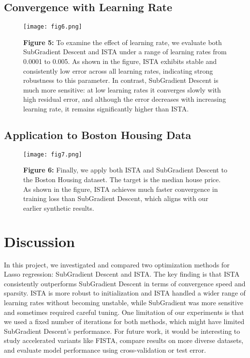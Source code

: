 \documentclass[11pt]{article}
\begin{document}
\subsection{Convergence with Learning Rate}


\begin{figure}[H]
\centering
\begin{minipage}{0.3\textwidth}
    \texttt{[image: fig6.png]}
\end{minipage}
\hfill
\begin{minipage}{0.5\textwidth}
    \small
    \textbf{Figure 5:} 
To examine the effect of learning rate, we evaluate both SubGradient Descent and ISTA under a range of learning rates from 0.0001 to 0.005.
As shown in the figure, ISTA exhibits stable and consistently low error across all learning rates, indicating strong robustness to this parameter. In contrast, SubGradient Descent is much more sensitive: at low learning rates it converges slowly with high residual error, and although the error decreases with increasing learning rate, it remains significantly higher than ISTA. 
\end{minipage}
\end{figure}

\subsection{Application to Boston Housing Data}


\begin{figure}[H]
\centering
\begin{minipage}{0.3\textwidth}
    \texttt{[image: fig7.png]}
\end{minipage}
\hfill
\begin{minipage}{0.5\textwidth}
    \small
    \textbf{Figure 6:} 
Finally, we apply both ISTA and SubGradient Descent to the Boston Housing dataset. The 
target is the median house price.
As shown in the figure, ISTA achieves much faster convergence in training loss than SubGradient Descent, which aligns with our earlier synthetic results. 
   
\end{minipage}
\end{figure}


\section{Discussion}

In this project, we investigated and compared two optimization methods for Lasso regression: SubGradient Descent and ISTA.
The key finding is that ISTA consistently outperforms SubGradient Descent in terms of convergence speed and sparsity. 
ISTA is more robust to initialization and ISTA handled a wider range of learning rates without becoming unstable, while SubGradient was more sensitive and sometimes required careful tuning.
One limitation of our experiments is that we used a fixed number of iterations for both methods, which might have limited SubGradient Descent’s performance. 
For future work, it would be interesting to study accelerated variants like FISTA, compare results on more diverse datasets, and evaluate model performance using cross-validation or test error.
\end{document}
